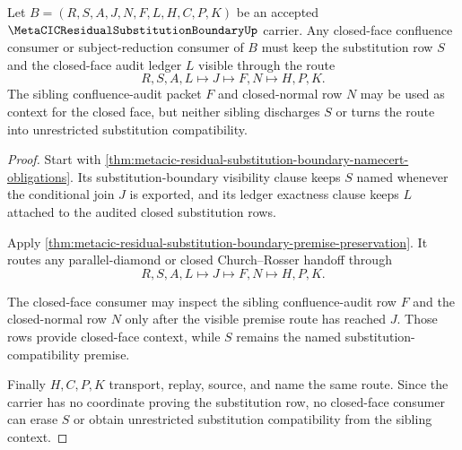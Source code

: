 \begin{theorem}
\label{thm:metacic-residual-substitution-boundary-closed-face-consumer}
Let $B=(R,S,A,J,N,F,L,H,C,P,K)$ be an accepted
$\MetaCICResidualSubstitutionBoundaryUp$ carrier. Any closed-face confluence
consumer or subject-reduction consumer of $B$ must keep the substitution row
$S$ and the closed-face audit ledger $L$ visible through the route
$$
R,S,A,L \longmapsto J \longmapsto F,N \longmapsto H,P,K .
$$
The sibling confluence-audit packet $F$ and closed-normal row $N$ may be used
as context for the closed face, but neither sibling discharges $S$ or turns
the route into unrestricted substitution compatibility.
\end{theorem}
\begin{proof}
Start with
\autoref{thm:metacic-residual-substitution-boundary-namecert-obligations}. Its
substitution-boundary visibility clause keeps $S$ named whenever the
conditional join $J$ is exported, and its ledger exactness clause keeps $L$
attached to the audited closed substitution rows.

Apply
\autoref{thm:metacic-residual-substitution-boundary-premise-preservation}. It
routes any parallel-diamond or closed Church--Rosser handoff through
$$
R,S,A,L \longmapsto J \longmapsto F,N \longmapsto H,P,K .
$$

The closed-face consumer may inspect the sibling confluence-audit row $F$ and
the closed-normal row $N$ only after the visible premise route has reached
$J$. Those rows provide closed-face context, while $S$ remains the named
substitution-compatibility premise.

Finally $H,C,P,K$ transport, replay, source, and name the same route. Since
the carrier has no coordinate proving the substitution row, no closed-face
consumer can erase $S$ or obtain unrestricted substitution compatibility from
the sibling context.
\end{proof}



